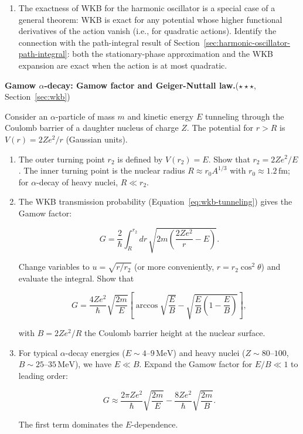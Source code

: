 \begin{problemset}
\begin{enumerate}
\item[(d)] The exactness of WKB for the harmonic oscillator is a special case of a general theorem: WKB is exact for any potential whose higher functional derivatives of the action vanish (i.e., for quadratic actions). Identify the connection with the path-integral result of Section~\ref{sec:harmonic-oscillator-path-integral}: both the stationary-phase approximation and the WKB expansion are exact when the action is at most quadratic.
\end{enumerate}

\item[9.] \textbf{Gamow $\alpha$-decay: Gamow factor and Geiger-Nuttall law.}\quad($\star\star\star$, Section~\ref{sec:wkb})

Consider an $\alpha$-particle of mass $m$ and kinetic energy $E$ tunneling through the Coulomb barrier of a daughter nucleus of charge $Z$. The potential for $r > R$ is $V(r) = 2Ze^2/r$ (Gaussian units).

\begin{enumerate}
\item[(a)] The outer turning point $r_2$ is defined by $V(r_2) = E$. Show that $r_2 = 2Ze^2/E$. The inner turning point is the nuclear radius $R \approx r_0 A^{1/3}$ with $r_0 \approx 1.2\,\text{fm}$; for $\alpha$-decay of heavy nuclei, $R \ll r_2$.

\item[(b)] The WKB transmission probability (Equation~\eqref{eq:wkb-tunneling}) gives the Gamow factor:
\begin{linenomath}
\begin{equation}
G = \frac{2}{\hbar}\int_R^{r_2} dr\,\sqrt{2m\left(\frac{2Ze^2}{r} - E\right)}.
\end{equation}
\end{linenomath}
Change variables to $u = \sqrt{r/r_2}$ (or more conveniently, $r = r_2\cos^2\theta$) and evaluate the integral. Show that
\begin{linenomath}
\begin{equation}
G = \frac{4Ze^2}{\hbar}\sqrt{\frac{2m}{E}}\left[\arccos\sqrt{\frac{E}{B}} - \sqrt{\frac{E}{B}\left(1-\frac{E}{B}\right)}\right],
\end{equation}
\end{linenomath}
with $B = 2Ze^2/R$ the Coulomb barrier height at the nuclear surface.

\item[(c)] For typical $\alpha$-decay energies ($E \sim 4\text{--}9\,\text{MeV}$) and heavy nuclei ($Z \sim 80\text{--}100$, $B \sim 25\text{--}35\,\text{MeV}$), we have $E \ll B$. Expand the Gamow factor for $E/B \ll 1$ to leading order:
\begin{linenomath}
\begin{equation}
G \approx \frac{2\pi Ze^2}{\hbar}\sqrt{\frac{2m}{E}} - \frac{8Ze^2}{\hbar}\sqrt{\frac{2m}{B}}.
\end{equation}
\end{linenomath}
The first term dominates the $E$-dependence.


\end{enumerate}
\end{problemset}
